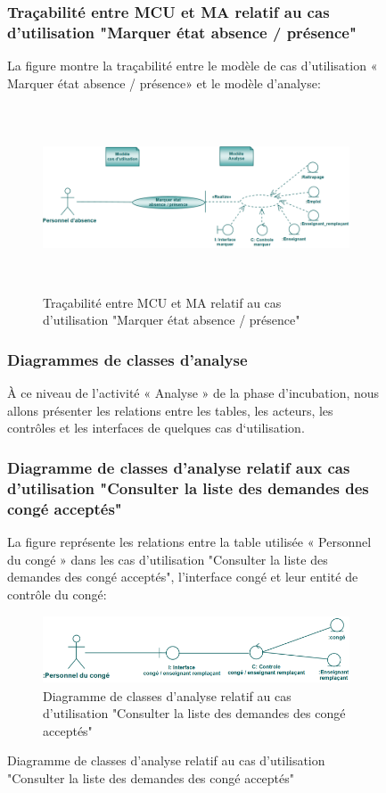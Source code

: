 \documentclass[12 pt]{report}
\begin{document}
\begin{figure}[h]
\begin{center}
\subsubsection{Traçabilité entre MCU et MA relatif au  cas d’utilisation "Marquer état absence / présence" }
La figure  montre la traçabilité entre le modèle de  cas d’utilisation « Marquer état absence / présence» et le modèle d’analyse:
\begin{figure}[h]
\begin{center}
\includegraphics[width= 12cm , height =5.5cm]{tra_mar_abs.PNG}
\caption{Traçabilité entre MCU et MA relatif au  cas d’utilisation "Marquer état absence / présence"}
\end{center}
\end{figure}
\subsubsection{Diagrammes de classes d'analyse}
 À ce niveau de l’activité « Analyse » de la phase d’incubation, nous allons présenter les relations entre les tables, les acteurs, les contrôles et les interfaces de quelques cas d‘utilisation.
\subsubsection{Diagramme de classes d’analyse relatif aux cas d’utilisation "Consulter la liste des demandes des congé acceptés" }
La figure  représente les relations entre la table utilisée « Personnel du congé » dans les cas d’utilisation  "Consulter la liste des demandes des congé acceptés", l’interface  congé et  leur entité de  contrôle du congé:
\begin{figure}[h]
\begin{center}
\includegraphics[width= 12cm , height =2cm]{cla_con_rem.png}
\caption{Diagramme de classes d’analyse relatif au cas d’utilisation  "Consulter la liste des demandes des congé acceptés"}
\end{center}
\end{figure}

\end{center}
\end{figure}
\end{document}

